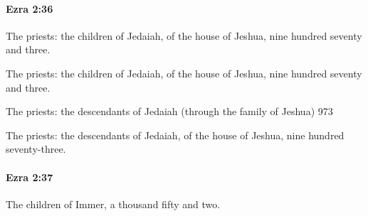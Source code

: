 		\paragraph{Ezra 2:36} %
			\label{EZRA-2-36}

			The priests: the children of Jedaiah, of the house of Jeshua, nine hundred seventy and three.

			\begin{versebox}
					\item[BHS] 
					\item[LXX] 
					\item[ASV] The priests: the children of Jedaiah, of the house of Jeshua, nine hundred seventy and three.
					\item[NIV] The priests: the descendants of Jedaiah (through the family of Jeshua) 973
					\item[NRSV] The priests: the descendants of Jedaiah, of the house of Jeshua, nine hundred seventy-three.
			\end{versebox}

		\paragraph{Ezra 2:37} %
			\label{EZRA-2-37}

			The children of Immer, a thousand fifty and two.

